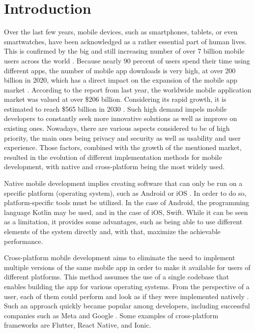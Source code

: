 
\chapter{Introduction}

Over the last few years, mobile devices, such as smartphones, tablets, or even smartwatches, have been acknowledged as a rather essential part of human lives. This is confirmed by the big and still increasing number of over 7 billion mobile users across the world \cite{statista_mobile_users_worldwide}. Because nearly 90 percent of users spend their time using different apps, the number of mobile app downloads is very high, at over 200 billion in 2020, which has a direct impact on the expansion of the mobile app market \cite{techjury_app_statistics}. According to the report from last year, the worldwide mobile application market was valued at over \$206 billion. Considering its rapid growth, it is estimated to reach \$565 billion in 2030 \cite{mobile_market_size}. Such high demand impels mobile developers to constantly seek more innovative solutions as well as improve on existing ones. Nowadays, there are various aspects considered to be of high priority, the main ones being privacy and security as well as usability and user experience. Those factors, combined with the growth of the mentioned market, resulted in the evolution of different implementation methods for mobile development, with native and cross-platform being the most widely used.

Native mobile development implies creating software that can only be run on a specific platform (operating system), such as Android or iOS \cite{cma_mobile_ecosystems_report}. In order to do so, platform-specific tools must be utilized. In the case of Android, the programming language Kotlin may be used, and in the case of iOS, Swift. While it can be seen as a limitation, it provides some advantages, such as being able to use different elements of the system directly and, with that, maximize the achievable performance.

Cross-platform mobile development aims to eliminate the need to implement multiple versions of the same mobile app in order to make it available for users of different platforms. This method assumes the use of a single codebase that enables building the app for various operating systems. From the perspective of a user, each of them could perform and look as if they were implemented natively \cite{decision_framework_cross_plaftorm}. Such an approach quickly became popular among developers, including successful companies such as Meta and Google \cite{kotlin_popular_cross_platform_frameworks}. Some examples of cross-platform frameworks are Flutter, React Native, and Ionic.

